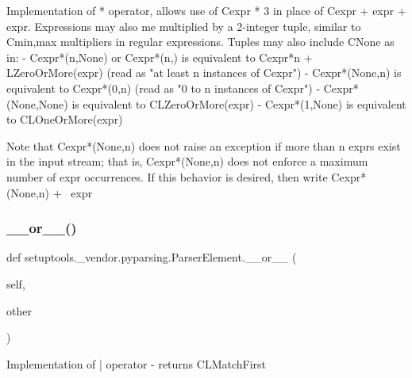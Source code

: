 \begin{DoxyVerb}Implementation of * operator, allows use of C{expr * 3} in place of
C{expr + expr + expr}.  Expressions may also me multiplied by a 2-integer
tuple, similar to C{{min,max}} multipliers in regular expressions.  Tuples
may also include C{None} as in:
 - C{expr*(n,None)} or C{expr*(n,)} is equivalent
      to C{expr*n + L{ZeroOrMore}(expr)}
      (read as "at least n instances of C{expr}")
 - C{expr*(None,n)} is equivalent to C{expr*(0,n)}
      (read as "0 to n instances of C{expr}")
 - C{expr*(None,None)} is equivalent to C{L{ZeroOrMore}(expr)}
 - C{expr*(1,None)} is equivalent to C{L{OneOrMore}(expr)}

Note that C{expr*(None,n)} does not raise an exception if
more than n exprs exist in the input stream; that is,
C{expr*(None,n)} does not enforce a maximum number of expr
occurrences.  If this behavior is desired, then write
C{expr*(None,n) + ~expr}
\end{DoxyVerb}
 \mbox{\label{classsetuptools_1_1__vendor_1_1pyparsing_1_1_parser_element_a3780a29c2e272d2aaf4600acde2b57f5}} 
\subsubsection{\texorpdfstring{\+\_\+\+\_\+or\+\_\+\+\_\+()}{\_\_or\_\_()}}
{\footnotesize\ttfamily def setuptools.\+\_\+vendor.\+pyparsing.\+Parser\+Element.\+\_\+\+\_\+or\+\_\+\+\_\+ (\begin{DoxyParamCaption}\item[{}]{self,  }\item[{}]{other }\end{DoxyParamCaption})}

\begin{DoxyVerb}Implementation of | operator - returns C{L{MatchFirst}}
\end{DoxyVerb}
 \mbox{\label{classsetuptools_1_1__vendor_1_1pyparsing_1_1_parser_element_abee68ac65a25d3a6d4e0fba4cdc8602c}} 
